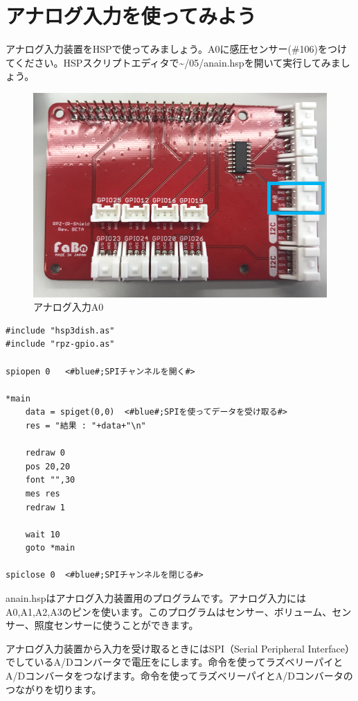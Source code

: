 \newpage
\section{アナログ入力を使ってみよう}
アナログ入力装置をHSPで使ってみましょう。A0に感圧センサー(\#106)をつけてください。HSPスクリプトエディタで\textasciitilde /05/anain.hspを開いて実行してみましょう。\\
\begin{figure}[H]
    \centering
    \includegraphics[scale=0.6]{images/chap05/text05-img030.png}
    \caption{アナログ入力A0}
\end{figure}

\begin{lstlisting}[caption=anain.hsp,label=anain.hsp]
#include "hsp3dish.as"
#include "rpz-gpio.as"

spiopen 0	<#blue#;SPIチャンネルを開く#>

*main
	data = spiget(0,0)	<#blue#;SPIを使ってデータを受け取る#>
	res = "結果 : "+data+"\n"

	redraw 0
	pos 20,20
	font "",30
	mes res
	redraw 1

	wait 10
	goto *main

spiclose 0	<#blue#;SPIチャンネルを閉じる#>
\end{lstlisting}

anain.hspはアナログ入力装置用のプログラムです。アナログ入力にはA0,A1,A2,A3のピンを使います。このプログラムはセンサー、ボリューム、センサー、照度センサーに使うことができます。

アナログ入力装置から入力を受け取るときにはSPI（Serial Peripheral Interface）でしているA/Dコンバータで電圧をにします。命令を使ってラズベリーパイとA/Dコンバータをつなげます。命令を使ってラズベリーパイとA/Dコンバータのつながりを切ります。

